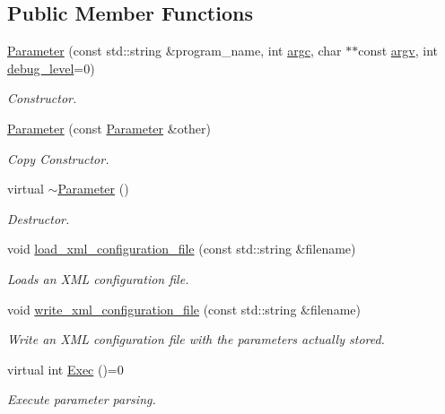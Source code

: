 \subsection*{Public Member Functions}
\begin{DoxyCompactItemize}
\item 
\hyperlink{classParameter_ad9b5b31ed2ef3489d993085da7452397}{Parameter} (const std\+::string \&program\+\_\+name, int \hyperlink{classParameter_a76b21c2ed27f73883401229217020814}{argc}, char $\ast$$\ast$const \hyperlink{classParameter_a538da2e132ca91996baa116097d6238f}{argv}, int \hyperlink{classParameter_a03af0919e121aef0fa02cd11de566a80}{debug\+\_\+level}=0)
\begin{DoxyCompactList}\small\item\em Constructor. \end{DoxyCompactList}\item 
\hyperlink{classParameter_ad3f5d861da24673d97bd1bd206b0b89a}{Parameter} (const \hyperlink{classParameter}{Parameter} \&other)
\begin{DoxyCompactList}\small\item\em Copy Constructor. \end{DoxyCompactList}\item 
virtual \hyperlink{classParameter_a6e2ade42a712f1d3675653329266e42d}{$\sim$\+Parameter} ()
\begin{DoxyCompactList}\small\item\em Destructor. \end{DoxyCompactList}\item 
void \hyperlink{classParameter_a7e7dfa3795e73f61f5f4ff92732f58c2}{load\+\_\+xml\+\_\+configuration\+\_\+file} (const std\+::string \&filename)
\begin{DoxyCompactList}\small\item\em Loads an X\+ML configuration file. \end{DoxyCompactList}\item 
void \hyperlink{classParameter_aad809169029074f9f29fb1c7d380be03}{write\+\_\+xml\+\_\+configuration\+\_\+file} (const std\+::string \&filename)
\begin{DoxyCompactList}\small\item\em Write an X\+ML configuration file with the parameters actually stored. \end{DoxyCompactList}\item 
virtual int \hyperlink{classParameter_a9f5cc51b6e9ac1e01fe1c5a6362c030b}{Exec} ()=0
\begin{DoxyCompactList}\small\item\em Execute parameter parsing. \end{DoxyCompactList}\item 
$$
\end{DoxyCompactItemize}
